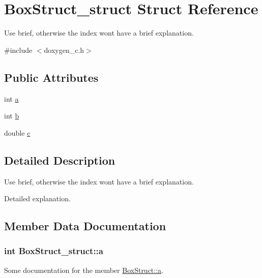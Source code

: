 \hypertarget{structBoxStruct__struct}{}\section{Box\+Struct\+\_\+struct Struct Reference}
\label{structBoxStruct__struct}


Use brief, otherwise the index won\textquotesingle{}t have a brief explanation.  




{\ttfamily \#include $<$doxygen\+\_\+c.\+h$>$}

\subsection*{Public Attributes}
\begin{DoxyCompactItemize}
\item 
int \hyperlink{structBoxStruct__struct_a4593938c5e90f024e7971bdb1392d9d6}{a}
\item 
int \hyperlink{structBoxStruct__struct_aee44748dc579c5d794853ee8b133d197}{b}
\item 
double \hyperlink{structBoxStruct__struct_a4543370ed67b2cf5ae3f55201bea11e6}{c}
\end{DoxyCompactItemize}


\subsection{Detailed Description}
Use brief, otherwise the index won\textquotesingle{}t have a brief explanation. 

Detailed explanation. 

\subsection{Member Data Documentation}
\subsubsection[{\texorpdfstring{a}{a}}]{\setlength{\rightskip}{0pt plus 5cm}int Box\+Struct\+\_\+struct\+::a}\hypertarget{structBoxStruct__struct_a4593938c5e90f024e7971bdb1392d9d6}{}\label{structBoxStruct__struct_a4593938c5e90f024e7971bdb1392d9d6}
Some documentation for the member \hyperlink{structBoxStruct__struct_a4593938c5e90f024e7971bdb1392d9d6}{Box\+Struct\+::a}. 
